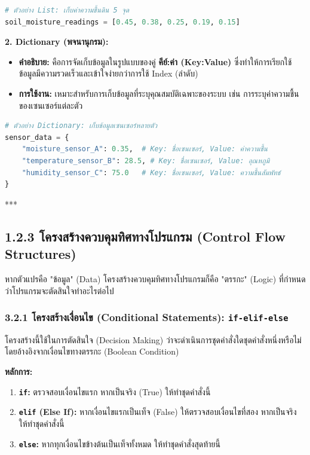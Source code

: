 \documentclass[11pt,a4paper,openany]{report}
\begin{document}
\begin{lstlisting}[language=Python]
# ตัวอย่าง List: เก็บค่าความชื้นดิน 5 จุด
soil_moisture_readings = [0.45, 0.38, 0.25, 0.19, 0.15]
\end{lstlisting}


\textbf{2. Dictionary (พจนานุกรม):}
\begin{itemize}
  \item \textbf{คำอธิบาย:} คือการจัดเก็บข้อมูลในรูปแบบของคู่ \textbf{คีย์:ค่า (Key:Value)} ซึ่งทำให้การเรียกใช้ข้อมูลมีความรวดเร็วและเข้าใจง่ายกว่าการใช้ Index (ลำดับ)
  \item \textbf{การใช้งาน:} เหมาะสำหรับการเก็บข้อมูลที่ระบุคุณสมบัติเฉพาะของระบบ เช่น การระบุค่าความชื้นของเซนเซอร์แต่ละตัว
\end{itemize}


\begin{lstlisting}[language=Python]
# ตัวอย่าง Dictionary: เก็บข้อมูลเซนเซอร์หลายตัว
sensor_data = {
    "moisture_sensor_A": 0.35,  # Key: ชื่อเซนเซอร์, Value: ค่าความชื้น
    "temperature_sensor_B": 28.5, # Key: ชื่อเซนเซอร์, Value: อุณหภูมิ
    "humidity_sensor_C": 75.0   # Key: ชื่อเซนเซอร์, Value: ความชื้นสัมพัทธ์
}
\end{lstlisting}


***

\subsection{1.2.3 โครงสร้างควบคุมทิศทางโปรแกรม (Control Flow Structures)}


หากตัวแปรคือ "ข้อมูล" (Data) โครงสร้างควบคุมทิศทางโปรแกรมก็คือ "ตรรกะ" (Logic) ที่กำหนดว่าโปรแกรมจะตัดสินใจทำอะไรต่อไป

\subsubsection{3.2.1 โครงสร้างเงื่อนไข (Conditional Statements): \texttt{if-elif-else}}


โครงสร้างนี้ใช้ในการตัดสินใจ (Decision Making) ว่าจะดำเนินการชุดคำสั่งใดชุดคำสั่งหนึ่งหรือไม่ โดยอ้างอิงจากเงื่อนไขทางตรรกะ (Boolean Condition)

\textbf{หลักการ:}
\begin{enumerate}
  \item \textbf{\texttt{if}:} ตรวจสอบเงื่อนไขแรก หากเป็นจริง (True) ให้ทำชุดคำสั่งนี้
  \item \textbf{\texttt{elif} (Else If):} หากเงื่อนไขแรกเป็นเท็จ (False) ให้ตรวจสอบเงื่อนไขที่สอง หากเป็นจริง ให้ทำชุดคำสั่งนี้
  \item \textbf{\texttt{else}:} หากทุกเงื่อนไขข้างต้นเป็นเท็จทั้งหมด ให้ทำชุดคำสั่งสุดท้ายนี้
\end{enumerate}
\end{document}

